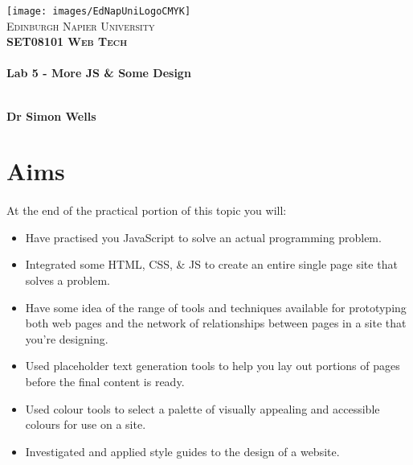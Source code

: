 \documentclass[10pt, a4paper, twosize]{article}
\begin{document}

\begin{titlepage}
\vspace*{5cm}
\begin{center}
\texttt{[image: images/EdNapUniLogoCMYK]}~\\[1cm]

\textsc{\Large Edinburgh Napier University}\\[1.5cm]

\textsc{\LARGE \bfseries SET08101 Web Tech}\\[0.5cm]

\hrulefill \\[0.4cm]
{\huge \bfseries Lab 5 - More JS \& Some Design \\[0.4cm] }
\hrulefill \\[1.5cm]

\begin{minipage}{0.4\textwidth}
\begin{flushleft} \large
\textbf{Dr Simon Wells} \\
\end{flushleft}
\end{minipage}

\vfill

\end{center}
\end{titlepage}




%

\section{Aims}
\paragraph{} At the end of the practical portion of this topic you will:

\begin{itemize}
\item Have practised you JavaScript to solve an actual programming problem.
\item Integrated some HTML, CSS, \& JS to create an entire single page site that solves a problem.
\item Have some idea of the range of tools and techniques available for prototyping both web pages and the network of relationships between pages in a site that you're designing.
\item Used placeholder text generation tools to help you lay out portions of pages before the final content is ready.
\item Used colour tools to select a palette of visually appealing and accessible colours for use on a site.
\item Investigated and applied style guides to the design of a website.
\end{itemize}
\end{document}
